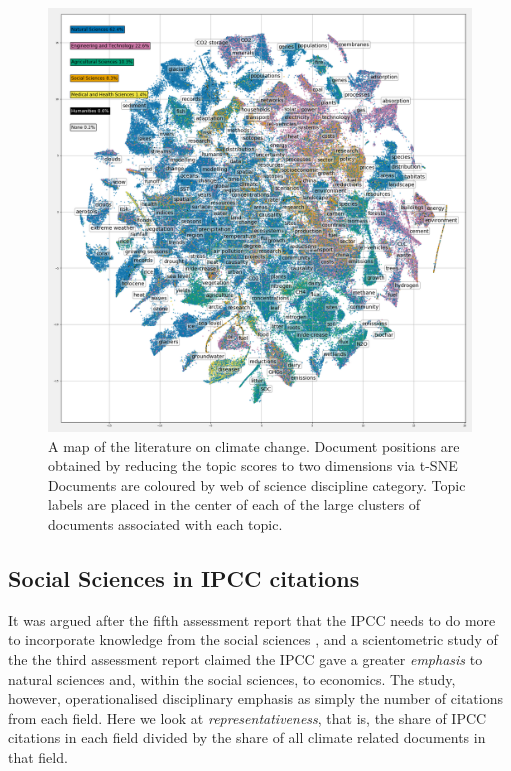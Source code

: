 \documentclass{article}
\begin{document}
\begin{linenumbers}
\begin{figure}
	\begin{center}
		\includegraphics[width=1\linewidth]{tsne_results/plots/run_1861_s_0_p100_all_topic_words_oecds_big.png}
		\caption{A map of the literature on climate change. Document positions are obtained by reducing the topic scores to two dimensions via t-SNE Documents are coloured by web of science discipline category. Topic labels are placed in the center of each of the large clusters of documents associated with each topic. }
		\label{oecd_topic_map}
	\end{center}
\end{figure}

\subsection*{Social Sciences in IPCC citations}

It was argued after the fifth assessment report that the IPCC needs to do more to incorporate knowledge from the social sciences \cite{Victor2015}, and a scientometric study of the  the third assessment report claimed the IPCC gave a greater \textit{emphasis} to natural sciences and, within the social sciences, to economics. The study, however, operationalised disciplinary emphasis as simply the number of citations from each field. Here we look at \textit{representativeness}, that is, the share of IPCC citations in each field divided by the share of all climate related documents in that field.


\end{linenumbers}
\end{document}
